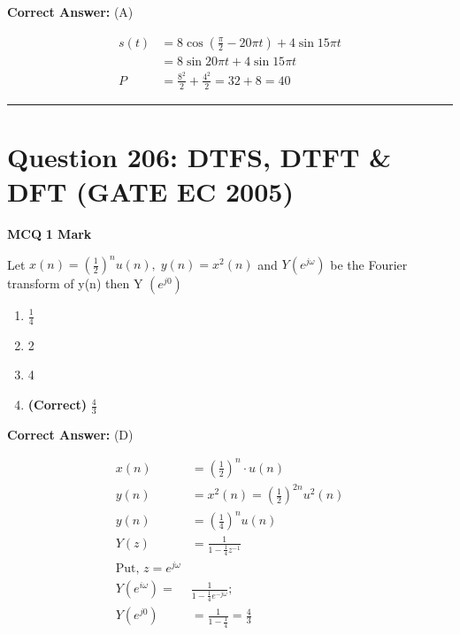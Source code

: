 \documentclass[11pt,a4paper]{article}
\begin{document}
\noindent \textbf{Correct Answer:} (A)

\begin{tcolorbox}[solbox, title=Detailed Solution -- Question 205]
\[
\begin{aligned} s(t) &=8 \cos \left(\frac{\pi}{2}-20 \pi t\right)+4 \sin 15 \pi t \\ &=8 \sin 20 \pi t+4 \sin 15 \pi t \\ P &=\frac{8^{2}}{2}+\frac{4^{2}}{2}=32+8=40 \end{aligned}
\]
\end{tcolorbox}

\vspace{1.5em}
\hrule
\vspace{1.5em}

\section*{Question 206: DTFS, DTFT \& DFT (GATE EC 2005)}
\noindent \textbf{\color{primary}MCQ} \hfill \textbf{\color{secondary}1 Mark}


\noindent Let 
$x(n)=(\frac{1}{2})^{n}u(n), \; y(n)=x^{2}(n)$
 and $Y(e^{j\omega })$ be the Fourier transform of y(n) then Y $(e^{j0})$


\begin{enumerate}[label=(\Alph*)]
    \item $\frac{1}{4}$
    \item 2
    \item 4
    \item \textbf{(Correct)} $\frac{4}{3}$
\end{enumerate}

\noindent \textbf{Correct Answer:} (D)

\begin{tcolorbox}[solbox, title=Detailed Solution -- Question 206]
\[
\begin{aligned} x(n)&=\left(\frac{1}{2}\right)^{n} \cdot u(n) \\ y(n)&=x^{2}(n)=\left(\frac{1}{2}\right)^{2 n} u^{2}(n) \\ y(n)&=\left(\frac{1}{4}\right)^{n} u(n) \\ Y(z)&=\frac{1}{1-\frac{1}{4} z^{-1}} \\ \text{Put, }z=e^{j \omega}& \\ Y\left(e^{i \omega}\right)=&\frac{1}{1-\frac{1}{4} e^{-j \omega}} ; \\ Y\left(e^{j 0}\right)&=\frac{1}{1-\frac{1}{4}}=\frac{4}{3} \end{aligned}
\]
\end{tcolorbox}
\end{document}
